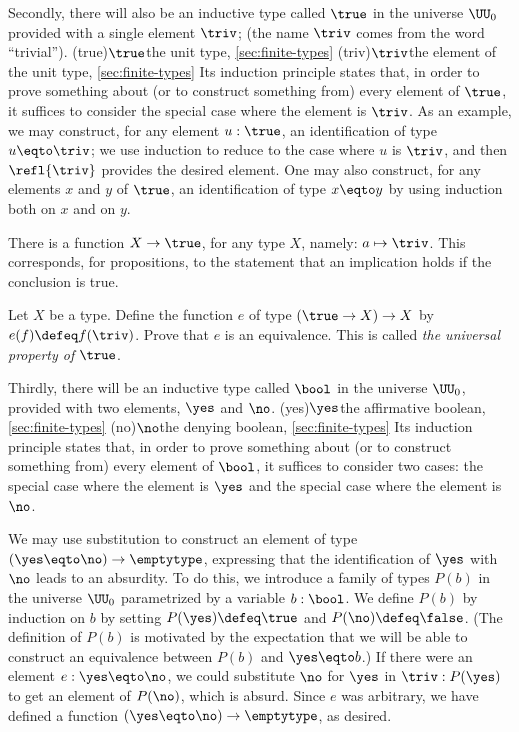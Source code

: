 Secondly, there will also be an inductive type called $\true$ in the universe $\UU_0$ provided with a single element $\triv$; (the name $\triv$
comes from the word ``trivial'').%
  \glossary(true){$\protect\true$}{the unit type,
      \cref{sec:finite-types}}%
  \glossary(triv){$\protect\triv$}{the element of the unit type,
      \cref{sec:finite-types}}
Its induction principle states that, in order to prove something about (or to construct something from) every
element of $\true$, it suffices to consider the special case where the element is $\triv$.  As an example, we may construct, for any element
$u : \true$, an identification of type $u \eqto \triv$; we use induction to reduce to the case where $u$ is $\triv$, and then $\refl{\triv}$ provides the
desired element.  One may also construct, for any elements $x$ and $y$ of $\true$, an identification of type $x \eqto y$ by using induction both on $x$ and
on $y$.

There is a function $X \to \true$, for any type $X$, namely: $a \mapsto \triv$.  This corresponds, for propositions, to the statement that an
implication holds if the conclusion is true.

\begin{xca}\label{xca:True-univ-prop}
  Let $X$ be a type. Define the function $e$ of type
  $(\true\to X) \to X$ by $e(f)\defeq f(\triv)$.
  Prove that $e$ is an equivalence.
  This is called \emph{the universal property of} $\true$.
\end{xca}

Thirdly, there will be an inductive type called $\bool$ in the universe $\UU_0$, provided with two elements, $\yes$ and $\no$.%
  \glossary(yes){$\protect\yes$}{the affirmative boolean,
      \cref{sec:finite-types}}%
  \glossary(no){$\protect\no$}{the denying boolean,
      \cref{sec:finite-types}}
Its induction
principle states that, in order to prove something about (or to construct something from) every element of $\bool$, it suffices to consider two
cases: the special case where the element is $\yes$ and the special case where the element is $\no$.

We may use substitution to construct an element of type
$(\yes \eqto \no)\to \emptytype$, expressing that the identification
of $\yes$ with $\no$ leads to an absurdity.
To do this, we introduce a family of types $P(b)$ in the universe
$\UU_0$ parametrized by a variable $b:\bool$.  We define $P(b)$ by induction on $b$ by setting $P(\yes) \defeq \true$ and
$P(\no) \defeq \false$.  (The definition of $P(b)$ is motivated by the expectation that we will be able to construct an equivalence between $P(b)$ and
$\yes \eqto b$.)  If there were an element $e: \yes \eqto \no$, we could substitute $\no$ for $\yes$ in $\triv : P (\yes)$ to get an element of $P(\no)$,
which is absurd.  Since $e$ was arbitrary, we have defined a function $(\yes \eqto \no) \to \emptytype$, as desired.


